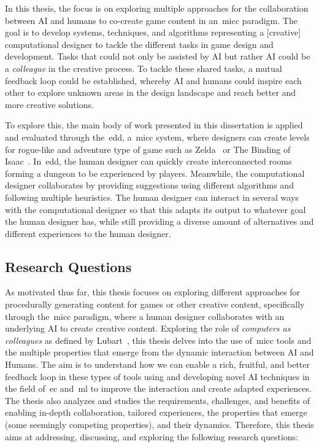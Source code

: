 In this thesis, the focus is on exploring multiple approaches for the collaboration between AI and humans to co-create game content in an~\acrlong{micc} paradigm. The goal is to develop systems, techniques, and algorithms representing a [creative] computational designer to tackle the different tasks in game design and development. Tasks that could not only be assisted by AI but rather AI could be a \emph{colleague} in the creative process. To tackle these shared tasks, a mutual feedback loop could be established, whereby AI and humans could inspire each other to explore unknown areas in the design landscape and reach better and more creative solutions.

To explore this, the main body of work presented in this dissertation is applied and evaluated through the~\acrfull{edd}, a~\acrlong{micc} system, where designers can create levels for rogue-like and adventure type of game such as Zelda~\cite{tloz} or The Binding of Isaac~\cite{bindingISAAC}. In~\acrshort{edd}, the human designer can quickly create interconnected rooms forming a dungeon to be experienced by players. Meanwhile, the computational designer collaborates by providing suggestions using different algorithms and following multiple heuristics. The human designer can interact in several ways with the computational designer so that this adapts its output to whatever goal the human designer has, while still providing a diverse amount of alternatives and different experiences to the human designer.

\subsection{Research Questions} \label{sec:RQS}

As motivated thus far, this thesis focuses on exploring different approaches for procedurally generating content for games or other creative content, specifically through the~\acrshort{micc} paradigm, where a human designer collaborates with an underlying AI to create creative content. Exploring the role of \emph{computers as colleagues} as defined by Lubart~\cite{LUBART2005-computerPartners}, this thesis delves into the use of~\acrshort{micc} tools and the multiple properties that emerge from the dynamic interaction between AI and Humans. The aim is to understand how we can enable a rich, fruitful, and better feedback loop in these types of tools using and developing novel AI techniques in the field of~\acrlong{ec} and~\acrlong{ml} to improve the interaction and create adapted experiences. The thesis also analyzes and studies the requirements, challenges, and benefits of enabling in-depth collaboration, tailored experiences, the properties that emerge (some seemingly competing properties), and their dynamics. Therefore, this thesis aims at addressing, discussing, and exploring the following research questions: 

